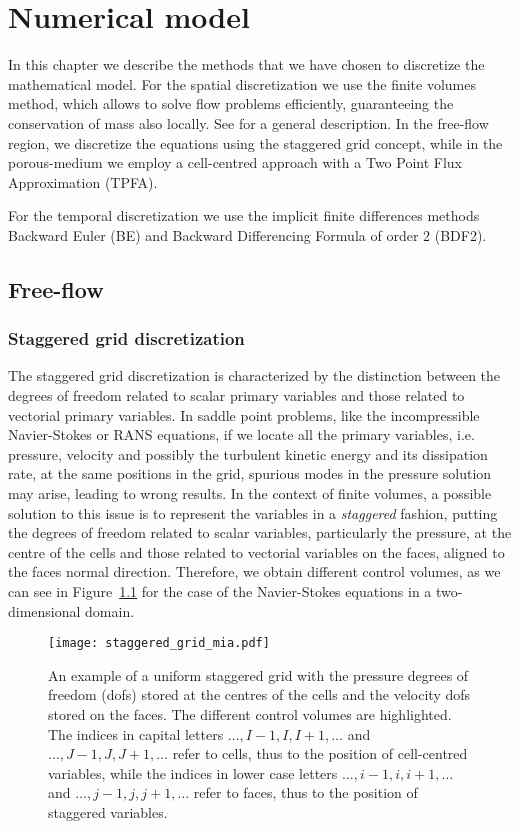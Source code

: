 \chapter{Numerical model} \label{chap:discretization} %
In this chapter we describe the methods that we have chosen to discretize the mathematical model. 
For the spatial discretization we use the finite volumes method, which allows 
to solve flow problems efficiently, guaranteeing the conservation of mass also locally. See 
\cite{fv:leveque} for a general description.
In the free-flow region, we discretize the equations using the staggered grid 
concept, while in the porous-medium we employ a cell-centred approach with a 
Two Point Flux Approximation (TPFA).

For the temporal discretization we use the implicit finite differences methods 
Backward Euler (BE) and Backward Differencing Formula of order 2 (BDF2).
%
\section{Free-flow}
\subsection{Staggered grid discretization}
The staggered grid discretization is characterized by the distinction between 
the degrees of freedom related to scalar primary variables and those related to 
vectorial primary variables. In saddle point problems, like the incompressible 
Navier-Stokes or RANS equations, if we locate all the primary variables, i.e. 
pressure, velocity and possibly the turbulent kinetic energy and its 
dissipation rate, at the same positions in the grid, spurious modes in the 
pressure solution may arise, leading to wrong results. In the context of finite 
volumes, a possible solution to 
this issue 
is to represent the variables in a \emph{staggered} fashion, putting 
the degrees of freedom related to scalar variables, particularly the 
pressure, at the centre of the cells 
and those related to vectorial variables on the faces, aligned to the faces 
normal direction. Therefore, we obtain different control volumes, as we can see 
in Figure~\ref{fig:staggrid} for the case of the 
Navier-Stokes equations in a two-dimensional domain.
\begin{figure}[t]
	\centering
	\texttt{[image: staggered\_grid\_mia.pdf]}
	\caption[Staggered grid control volumes]{An example of a uniform staggered 
	grid with the pressure degrees of freedom (dofs) stored at the centres of 
	the cells and the velocity dofs stored on the faces. The different control 
	volumes are highlighted. The indices in capital letters $\dots, I-1, I, 
	I+1, \dots$ and $\dots, J-1, J, J+1, \dots$ refer to cells, thus to the 
	position of cell-centred variables, while the indices in lower case letters 
	$\dots, i-1, i, i+1, \dots$ and $\dots,j-1,j,j+1,\dots$ refer to faces, 
	thus to the position of staggered variables.}
	\label{fig:staggrid}
\end{figure}

